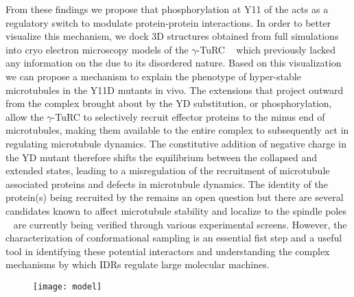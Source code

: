 From these findings we propose that phosphorylation at Y11 of the \gct acts as a regulatory switch to modulate protein-protein interactions. In order to better visualize this mechanism, we dock 3D structures obtained from full \tub simulations into cryo electron microscopy models of the $\gamma$-TuRC ~\cite{kollman2015ring}  which previously lacked any information on the \gct due to its disordered nature. Based on this visualization we can propose a mechanism to explain the phenotype of hyper-stable microtubules in the Y11D mutants in vivo. The extensions that project outward from the complex brought about by the YD substitution, or phosphorylation, allow the $\gamma$-TuRC to selectively recruit effector proteins to the minus end of microtubules, making them available to the entire complex to subsequently act in regulating microtubule dynamics. The constitutive addition of negative charge in the YD mutant therefore shifts the equilibrium between the collapsed and extended states, leading to a misregulation of the recruitment of microtubule associated proteins and defects in microtubule dynamics. The identity of the  protein(s) being recruited by the \gct remains an open question but there are several candidates known to affect microtubule stability and localize to the spindle poles ~\cite{cuschieri2006gamma} are currently being verified through various experimental screens. However, the characterization of \gct conformational sampling  is an essential fist step and a useful tool in identifying these potential interactors and understanding the complex mechanisms by which IDRs regulate large molecular machines.

\begin{figure}
\centering
\texttt{[image: model]}
\label{fig:turc}
\end{figure}
